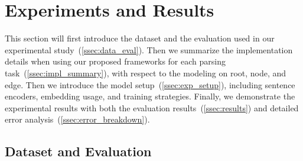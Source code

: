 \section{Experiments and Results}
\label{sec:lex-phr:exp}
This section will first introduce the dataset and the evaluation used
in our experimental study~(\autoref{ssec:data_eval}). Then we
summarize the implementation details when using our proposed
frameworks for each parsing task~(\autoref{ssec:impl_summary}), with
respect to the modeling on root, node, and edge. Then we introduce the
model setup~(\autoref{ssec:exp_setup}), including sentence encoders,
embedding usage, and training strategies. Finally, we demonstrate the
experimental results with both the evaluation
results~(\autoref{ssec:results}) and detailed error
analysis~(\autoref{ssec:error_breakdown}).

\subsection{Dataset and Evaluation}
\label{ssec:data_eval}

